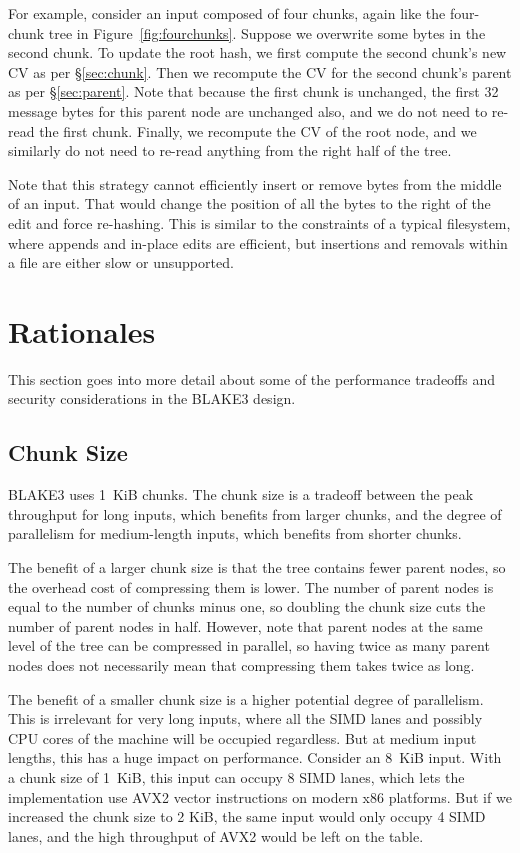 \documentclass[11pt,notitlepage,a4paper]{article}
\begin{document}
For example, consider an input composed of four chunks, again like the
four-chunk tree in Figure~\ref{fig:fourchunks}. Suppose we overwrite some bytes
in the second chunk. To update the root hash, we first compute the second
chunk's new CV as per \S\ref{sec:chunk}. Then we recompute the CV for the
second chunk's parent as per \S\ref{sec:parent}. Note that because the first
chunk is unchanged, the first 32 message bytes for this parent node are
unchanged also, and we do not need to re-read the first chunk. Finally, we
recompute the CV of the root node, and we similarly do not need to re-read
anything from the right half of the tree.

Note that this strategy cannot efficiently insert or remove bytes from the
middle of an input. That would change the position of all the bytes to the
right of the edit and force re-hashing. This is similar to the constraints of a
typical filesystem, where appends and in-place edits are efficient, but
insertions and removals within a file are either slow or unsupported.

\section{Rationales}\label{sec:rationales}

This section goes into more detail about some of the performance tradeoffs and
security considerations in the BLAKE3 design.

\subsection{Chunk Size}\label{sec:chunksize}

BLAKE3 uses 1~KiB chunks. The chunk size is a tradeoff between the peak
throughput for long inputs, which benefits from larger chunks, and the degree
of parallelism for medium-length inputs, which benefits from shorter chunks.

The benefit of a larger chunk size is that the tree contains fewer parent
nodes, so the overhead cost of compressing them is lower. The number of parent
nodes is equal to the number of chunks minus one, so doubling the chunk size
cuts the number of parent nodes in half. However, note that parent nodes at the
same level of the tree can be compressed in parallel, so having twice as many
parent nodes does not necessarily mean that compressing them takes twice as
long.

The benefit of a smaller chunk size is a higher potential degree of
parallelism. This is irrelevant for very long inputs, where all the SIMD lanes
and possibly CPU cores of the machine will be occupied regardless. But at
medium input lengths, this has a huge impact on performance. Consider an 8~KiB
input. With a chunk size of 1~KiB, this input can occupy 8 SIMD lanes, which
lets the implementation use AVX2 vector instructions on modern x86 platforms.
But if we increased the chunk size to 2 KiB, the same input would only occupy 4
SIMD lanes, and the high throughput of AVX2 would be left on the table.
\end{document}

